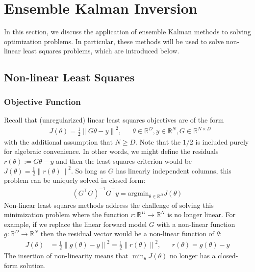 \documentclass[12pt]{article}
\newcommand*{\norm}[1]{\left\lVert#1\right\rVert}
\newcommand{\R}{\mathbb{R}}
\begin{document}
\section{Ensemble Kalman Inversion}
In this section, we discuss the application of ensemble Kalman methods to solving optimization problems. In particular, these methods will be used 
to solve non-linear least squares problems, which are introduced below. 

\subsection{Non-linear Least Squares}

\subsubsection{Objective Function}
Recall that (unregularized) linear least squares objectives are of the form 
\begin{align*}
&J(\theta) = \frac{1}{2} \norm{G\theta - y}^2, && \theta \in \R^D, y \in \R^N, G \in \R^{N \times D}
\end{align*}
with the additional assumption that $N \geq D$. Note that the $1/2$ is included purely for algebraic convenience. 
In other words, we might define the residuals $r(\theta) := G\theta - y$ and then the least-squares criterion would be $J(\theta) = \frac{1}{2} \norm{r(\theta)}^2$. So long as $G$ has linearly independent columns, this 
problem can be uniquely solved in closed form:
\begin{align}
(G^\top G)^{-1} G^\top y = \text{argmin}_{\theta \in \R^D} J(\theta) \label{linear_LS}
\end{align}
Non-linear least squares methods address the challenge of solving this minimization problem where the function $r: \R^D \to \R^N$ is no longer linear. For example, if we replace the linear forward 
model $G$ with a non-linear function $g: \R^D \to \R^N$ then the residual vector would be a non-linear function of $\theta$:
\begin{align*}
J(\theta) &= \frac{1}{2} \norm{g(\theta) - y}^2 = \frac{1}{2} \norm{r(\theta)}^2, && r(\theta) = g(\theta) - y
\end{align*}
The insertion of non-linearity means that $\min_{\theta} J(\theta)$ no longer has a closed-form solution. 
\end{document}
